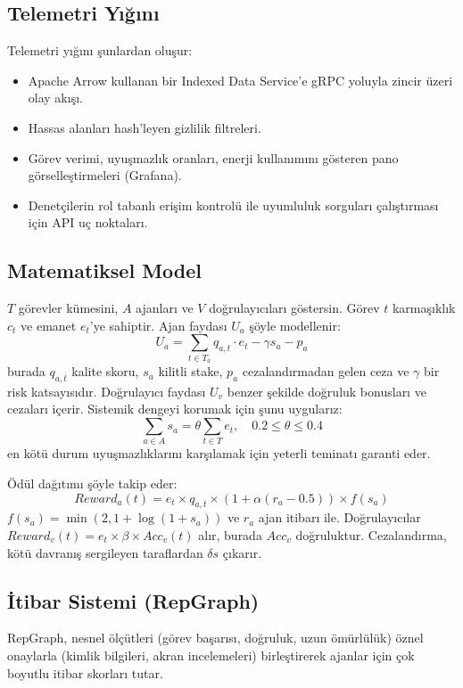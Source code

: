 \documentclass[11pt]{article}
\begin{document}
\subsection{Telemetri Yığını}
Telemetri yığını şunlardan oluşur:
\begin{itemize}[noitemsep]
  \item Apache Arrow kullanan bir Indexed Data Service'e gRPC yoluyla zincir üzeri olay akışı.
  \item Hassas alanları hash'leyen gizlilik filtreleri.
  \item Görev verimi, uyuşmazlık oranları, enerji kullanımını gösteren pano görselleştirmeleri (Grafana).
  \item Denetçilerin rol tabanlı erişim kontrolü ile uyumluluk sorguları çalıştırması için API uç noktaları.
\end{itemize}

\subsection{Matematiksel Model}
$T$ görevler kümesini, $A$ ajanları ve $V$ doğrulayıcıları göstersin. Görev $t$ karmaşıklık $c_t$ ve emanet $e_t$'ye sahiptir. Ajan faydası $U_a$ şöyle modellenir:
\begin{equation}
U_a = \sum_{t \in T_a} q_{a,t}\cdot e_t - \gamma s_a - p_a\label{eq:agent-utility}
\end{equation}
burada $q_{a,t}$ kalite skoru, $s_a$ kilitli stake, $p_a$ cezalandırmadan gelen ceza ve $\gamma$ bir risk katsayısıdır. Doğrulayıcı faydası $U_v$ benzer şekilde doğruluk bonusları ve cezaları içerir. Sistemik dengeyi korumak için şunu uygularız:
\begin{equation}
\sum_{a \in A} s_a = \theta \sum_{t \in T} e_t,\quad 0.2 \leq \theta \leq 0.4
\end{equation}
en kötü durum uyuşmazlıklarını karşılamak için yeterli teminatı garanti eder.

Ödül dağıtımı şöyle takip eder:
\begin{equation}
Reward_a(t) = e_t \times q_{a,t} \times \left(1 + \alpha (r_a - 0.5)\right) \times f(s_a)
\end{equation}
$f(s_a) = \min(2, 1 + \log(1+s_a))$ ve $r_a$ ajan itibarı ile. Doğrulayıcılar $Reward_v(t) = e_t \times \beta \times Acc_v(t)$ alır, burada $Acc_v$ doğruluktur. Cezalandırma, kötü davranış sergileyen taraflardan $\delta s$ çıkarır.

\subsection{İtibar Sistemi (RepGraph)}
\label{sec:reputation}
RepGraph, nesnel ölçütleri (görev başarısı, doğruluk, uzun ömürlülük) öznel onaylarla (kimlik bilgileri, akran incelemeleri) birleştirerek ajanlar için çok boyutlu itibar skorları tutar.
\end{document}
